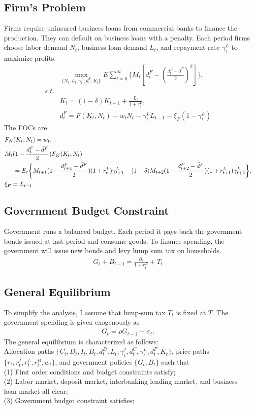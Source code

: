 \documentclass[12pt]{article}
\begin{document}
\subsection{Firm's Problem}
Firms require uninsured business loans from commercial banks to finance the production. They can default on business loans with a penalty. Each period firms choose 
labor demand $N_t$, business loan demand $L_t$, and repayment rate $\gamma_t^L$ to maximize profits. 
\begin{align}
  &\max_{\{N_t, L_t, \gamma_t^L, d_t^F, K_t\}} E \sum_{t=0}^{\infty} \{ M_t[d_t^F-(\frac{d_t^F-\bar{d}^F}{2})^2]\} ,\\
  s.t. \nonumber \\
  &K_t=(1-\delta)K_{t-1}+\frac{L_t}{1+r_t^L}, \\
  &d_t^F=F(K_t, N_t)-w_tN_t-\gamma_t^L L_{t-1}-\xi_F(1-\gamma_t^L)
\end{align}
The FOCs are 
\begin{align}
  &F_N(K_t, N_t)=w_t, \\
  &M_t (1-\frac{d_t^F-\bar{d}^F}{2})F_K(K_t, N_t) \nonumber \\
  &\hspace{5mm} = E_t \bigg\{ M_{t+1} (1-\frac{d_{t+1}^F-\bar{d}^F}{2} )(1+r_t^L)\gamma_{t+1}^L
  -(1-\delta)M_{t+2} (1 -\frac{d_{t+2}^F-\bar{d}^F}{2})(1+r_{t+1}^L)\gamma_{t+2}^L \bigg\}, \\
  &\xi_F = L_{t-1}
\end{align}


\subsection{Government Budget Constraint}
Government runs a balanced budget. Each period it pays back the government bonds issued at last period and consume goods. 
To finance spending, the government will issue new bonds and levy lump sum tax on households.
\begin{align}
  G_t+B_{t-1}=\frac{B_t}{1+r_t^B}+T_t
\end{align}


\subsection{General Equilibrium}
To simplify the analysis, I assume that lump-sum tax $T_t$ is fixed at $T$. The government spending is given exogenously as
\begin{align}
  G_t=\rho G_{t-1}+\sigma_t.
\end{align}
The general equilibrium is characterized as follows:\\
Allocation paths $\{C_t, D_t, I_t, B_t, d_t^D, L_t, \gamma_t^I, d_t^C, \gamma_t^L, d_t^F, K_t\}$, price paths $\{ r_t, r_t^I, r_t^L, r_t^B, w_t\}$, and
government policies $\{G_t, B_t\}$ such that \\
(1) First order conditions and budget constraints satisfy;\\
(2) Labor market, deposit market, interbanking lending market, and business loan market all clear;\\
(3) Government budget constraint satisfies;
\end{document}
